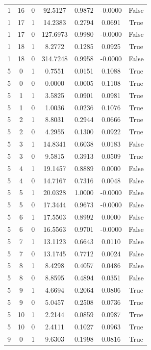 \documentclass[11pt, a4paper]{article}
\begin{document}
\begin{center}
    \begin{tabular}{|c|c|c|c|c|c|c|}
1 & 16 & 0 & 92.5127 & 0.9872 & -0.0000 & False \\
1 & 17 & 1 & 14.2383 & 0.2794 & 0.0691 & True \\
1 & 17 & 0 & 127.6973 & 0.9980 & -0.0000 & False \\
1 & 18 & 1 & 8.2772 & 0.1285 & 0.0925 & True \\
1 & 18 & 0 & 314.7248 & 0.9958 & -0.0000 & False \\
5 & 0 & 1 & 0.7551 & 0.0151 & 0.1088 & True \\
5 & 0 & 0 & 0.0000 & 0.0005 & 0.1108 & True \\   
5 & 1 & 1 & 3.5825 & 0.0901 & 0.0981 & True \\
5 & 1 & 0 & 1.0036 & 0.0236 & 0.1076 & True \\
5 & 2 & 1 & 8.8031 & 0.2944 & 0.0666 & True \\
5 & 2 & 0 & 4.2955 & 0.1300 & 0.0922 & True \\
5 & 3 & 1 & 14.8341 & 0.6038 & 0.0183 & False \\
5 & 3 & 0 & 9.5815 & 0.3913 & 0.0509 & True \\
5 & 4 & 1 & 19.1457 & 0.8889 & 0.0000 & False \\
5 & 4 & 0 & 14.7167 & 0.7316 & 0.0048 & False \\
5 & 5 & 1 & 20.0328 & 1.0000 & -0.0000 & False \\
5 & 5 & 0 & 17.3444 & 0.9673 & -0.0000 & False \\
5 & 6 & 1 & 17.5503 & 0.8992 & 0.0000 & False \\
5 & 6 & 0 & 16.5563 & 0.9701 & -0.0000 & False \\
5 & 7 & 1 & 13.1123 & 0.6643 & 0.0110 & False \\
5 & 7 & 0 & 13.1745 & 0.7712 & 0.0024 & False \\
5 & 8 & 1 & 8.4298 & 0.4057 & 0.0486 & False \\
5 & 8 & 0 & 8.8595 & 0.4894 & 0.0351 & False \\
5 & 9 & 1 & 4.6694 & 0.2064 & 0.0806 & True \\
5 & 9 & 0 & 5.0457 & 0.2508 & 0.0736 & True \\
5 & 10 & 1 & 2.2144 & 0.0859 & 0.0987 & True \\
5 & 10 & 0 & 2.4111 & 0.1027 & 0.0963 & True \\
9 & 0 & 1 & 9.6303 & 0.1998 & 0.0816 & True \\

\end{tabular}
\end{center}
\end{document}
